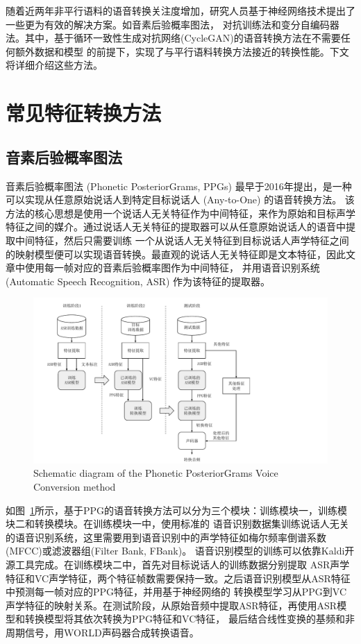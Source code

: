 随着近两年非平行语料的语音转换关注度增加，研究人员基于神经网络技术提出了一些更为有效的解决方案。如音素后验概率图法，
对抗训练法和变分自编码器法。其中，基于循环一致性生成对抗网络(CycleGAN)的语音转换方法在不需要任何额外数据和模型
的前提下，实现了与平行语料转换方法接近的转换性能。下文将详细介绍这些方法。

\section{常见特征转换方法}
\subsection{音素后验概率图法}
音素后验概率图法 (Phonetic PosteriorGrams, PPGs) 最早于2016年提出，是一种可以实现从任意原始说话人到特定目标说话人 (Any-to-One) 的语音转换方法\cite{sun2016phonetic}。
该方法的核心思想是使用一个说话人无关特征作为中间特征，来作为原始和目标声学特征之间的媒介。通过说话人无关特征的提取器可以从任意原始说话人的语音中提取中间特征，然后只需要训练
一个从说话人无关特征到目标说话人声学特征之间的映射模型便可以实现语音转换。最直观的说话人无关特征即是文本特征，因此文章中使用每一帧对应的音素后验概率图作为中间特征，
并用语音识别系统 (Automatic Speech Recognition, ASR) 作为该特征的提取器。

\begin{figure}[!htp]
    \centering
    \includegraphics[width=13cm,trim=10 0 160 0,clip]{figure/3_ppg.pdf}
    {Schematic diagram of the Phonetic PosteriorGrams Voice Conversion method}
    \label{fig:ppg}
\end{figure}

如图~\ref{fig:ppg}所示，基于PPG的语音转换方法可以分为三个模块：训练模块一，训练模块二和转换模块。在训练模块一中，使用标准的
语音识别数据集训练说话人无关的语音识别系统，这里需要用到语音识别中的声学特征如梅尔频率倒谱系数(MFCC)或滤波器组(Filter Bank, FBank)。
语音识别模型的训练可以依靠Kaldi开源工具\cite{povey2011kaldi}完成。在训练模块二中，首先对目标说话人的训练数据分别提取
ASR声学特征和VC声学特征，两个特征帧数需要保持一致。之后语音识别模型从ASR特征中预测每一帧对应的PPG特征，并用基于神经网络的
转换模型学习从PPG到VC声学特征的映射关系。在测试阶段，从原始音频中提取ASR特征，再使用ASR模型和转换模型将其依次转换为PPG特征和VC特征，
最后结合线性变换的基频和非周期信号，用WORLD声码器合成转换语音。

